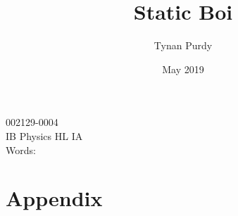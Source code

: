 \documentclass[12pt, letterpaper]{article}
\title{Static Boi}
\author{Tynan Purdy}
\date{May 2019}
\begin{document}
\large
\doublespace{}
\parindent=0.5in

{\fontsize{12}{14.4}
  {\singlespace
    \maketitle
    \begin{center}
    002129-0004 \\
    \vspace{4mm}
    IB Physics HL IA \\
    \vspace{4mm}
    Words:  \\ %
    \end{center}
  }
}	


\newpage
\tableofcontents
{}
\newpage

\section{}

\newpage
\printbibliography{}

\newpage
\section{Appendix}
\listoffigures{}
\end{document}
